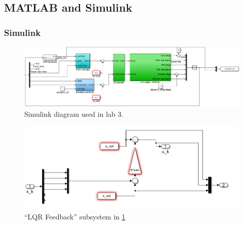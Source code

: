\documentclass[../main.tex]{subfiles}
\begin{document}
\clearpage

\subsection{MATLAB and Simulink}

\subsubsection{Simulink}
\begin{figure}[h]
	\centering
	\includegraphics[width=1\linewidth, keepaspectratio]{code/lab3_simulink_1}
	\caption{Simulink diagram used in lab 3.}
	\label{fig:lab3_simulink}
\end{figure}
\begin{figure}[h]
	\centering
	\includegraphics[width=1\linewidth, keepaspectratio]{code/lab3_simulink_2}
	\caption{``LQR Feedback'' subsystem in \cref{fig:lab3_simulink}}
	\label{fig:lab3_simulink_lqr}
\end{figure}
\end{document}

